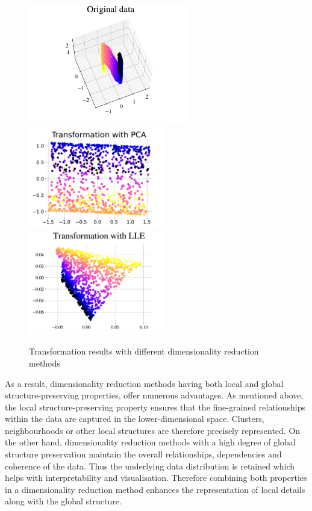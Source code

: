 \documentclass[pdftex,12pt,a4paper]{report}
\begin{document}
\begin{figure}[htb!] 
    \begin{center}
        \includegraphics[width=7cm]{images/demo-structure-preservation/original-data.pdf}
        \hfill
        \\[\smallskipamount]
        \includegraphics[width=6cm]{images/demo-structure-preservation/pca.pdf}\hfill
        \includegraphics[width=6cm]{images/demo-structure-preservation/lle.pdf}
        \caption{Transformation results with different dimensionality reduction methods}
        \label{demo:structure-preservation}
    \end{center} 
\end{figure}
As a result, dimensionality reduction methods having both local and global structure-preserving properties, offer numerous advantages.
As mentioned above, the local structure-preserving property ensures that the fine-grained relationships within the data are captured in the lower-dimensional space.
Clusters, neighbourhoods or other local structures are therefore precisely represented.
On the other hand, dimensionality reduction methods with a high degree of global structure preservation maintain the overall relationships, dependencies and coherence of the data.
Thus the underlying data distribution is retained which helps with interpretability and visualisation.
Therefore combining both properties in a dimensionality reduction method enhances the representation of local details along with the global structure.
\end{document}

